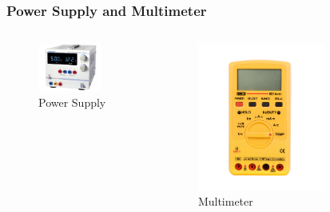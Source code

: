 \documentclass{beamer}
\begin{document}
\begin{frame} \frametitle{Power Supply and Multimeter}
  \begin{columns}
  \begin{column}{6cm}
  \begin{figure}
  \includegraphics[width=0.8\textwidth]{power}
  \caption{Power Supply}
  \end{figure}
  \end{column}
  \begin{column}{6cm}
  \begin{figure}
  \includegraphics[width=0.7\textwidth]{multim}
  \caption{Multimeter}
  \end{figure}
  \end{column}
  \end{columns}
\end{frame}
\end{document}
